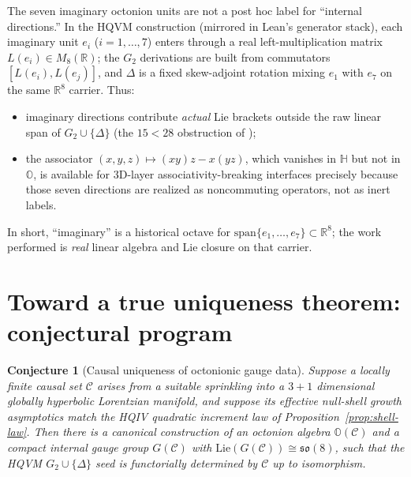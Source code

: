 \documentclass[11pt]{amsart}
\newtheorem{conjecture}[theorem]{Conjecture}
\begin{document}
The seven imaginary octonion units are not a post hoc label for ``internal directions.'' In the HQVM construction (mirrored in Lean's generator stack), each imaginary unit \(e_i\) (\(i=1,\dots,7\)) enters through a real left-multiplication matrix \(L(e_i)\in M_8(\mathbb{R})\); the \(G_2\) derivations are built from commutators \([L(e_i),L(e_j)]\), and \(\Delta\) is a fixed skew-adjoint rotation mixing \(e_1\) with \(e_7\) on the same \(\mathbb{R}^8\) carrier. Thus:
\begin{itemize}
  \item imaginary directions contribute \emph{actual} Lie brackets outside the raw linear span of \(G_2\cup\{\Delta\}\) (the \(15<28\) obstruction of \cite{hqiv-so8-paper});
  \item the associator \((x,y,z)\mapsto (xy)z-x(yz)\), which vanishes in \(\mathbb{H}\) but not in \(\mathbb{O}\), is available for \(3\)D-layer associativity-breaking interfaces precisely because those seven directions are realized as noncommuting operators, not as inert labels.
\end{itemize}
In short, ``imaginary'' is a historical octave for \(\mathrm{span}\{e_1,\dots,e_7\}\subset\mathbb{R}^8\); the work performed is \emph{real} linear algebra and Lie closure on that carrier.

\section{Toward a true uniqueness theorem: conjectural program}

\begin{conjecture}[Causal uniqueness of octonionic gauge data]
\label{conj:uniqueness}
Suppose a locally finite causal set \(\mathcal{C}\) arises from a suitable sprinkling into a \(3{+}1\) dimensional globally hyperbolic Lorentzian manifold, and suppose its effective null-shell growth asymptotics match the HQIV quadratic increment law of Proposition~\ref{prop:shell-law}. Then there is a canonical construction of an octonion algebra \(\mathbb{O}(\mathcal{C})\) and a compact internal gauge group \(G(\mathcal{C})\) with \(\mathrm{Lie}(G(\mathcal{C}))\cong \mathfrak{so}(8)\), such that the HQVM \(G_2\cup\{\Delta\}\) seed is functorially determined by \(\mathcal{C}\) up to isomorphism.
\end{conjecture}
\end{document}
